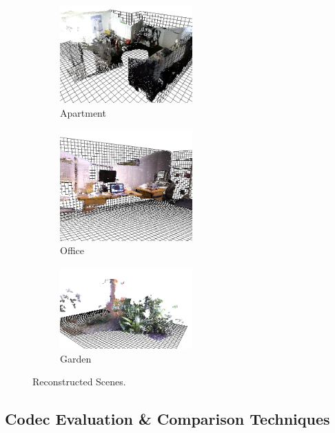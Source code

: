 \begin{figure}[t] 
        \centering
        \begin{subfigure}[b]{2.0in}
                \includegraphics[width=2.0in]{images/ch2/unit21}
                \caption{Apartment}
                \label{fig:RECON_UNIT}
        \end{subfigure}%
        \begin{subfigure}[b]{2.0in}
                \includegraphics[width=2.0in]{images/ch2/officeA}
                \caption{Office}
                \label{fig:RECON_OFFICE}
        \end{subfigure}%
        \begin{subfigure}[b]{2.0in}
                \includegraphics[width=2.0in]{images/ch2/outdoorA}
                \caption{Garden}
                \label{fig:RECON_GARDEN}
        \end{subfigure}
       \caption{Reconstructed Scenes.}
       \label{fig:RECONSTRUCTIONS}
\end{figure}


\subsection{Codec Evaluation \& Comparison Techniques}


